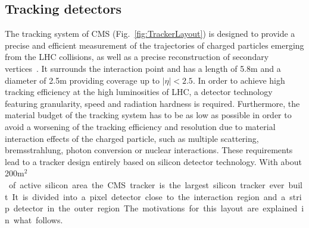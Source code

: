 \subsection{Tracking detectors}

The tracking system of CMS (Fig.~\ref{fig:TrackerLayout}) is designed to provide a precise and efficient measurement of the trajectories of charged particles emerging from the LHC collisions, as well as a precise reconstruction of secondary vertices~\cite{Karimaki:368412}. It surrounds the interaction point and has a length of 5.8\unit{m} and a diameter of 2.5\unit{m} providing coverage up to $|\eta| < 2.5$. In order to achieve high tracking efficiency at the high luminosities of LHC, a detector technology featuring granularity, speed and radiation hardness is required. Furthermore, the material budget of the tracking system has to be as low as possible in order to avoid a worsening of the tracking efficiency and resolution due to material interaction effects of the charged particle, such as multiple scattering, bremsstrahlung, photon conversion or nuclear interactions. These requirements lead to a tracker design entirely based on silicon detector technology. With about 200\unit{m$^2$} of active silicon area the CMS tracker is the largest silicon tracker ever built. It is divided into a pixel detector close to the interaction region and a strip detector in the outer region. The motivations for this layout are explained in what follows.

